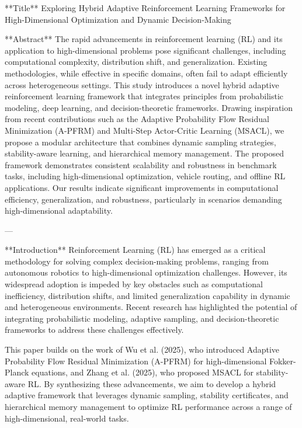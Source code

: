 **Title**  
Exploring Hybrid Adaptive Reinforcement Learning Frameworks for High-Dimensional Optimization and Dynamic Decision-Making  

**Abstract**  
The rapid advancements in reinforcement learning (RL) and its application to high-dimensional problems pose significant challenges, including computational complexity, distribution shift, and generalization. Existing methodologies, while effective in specific domains, often fail to adapt efficiently across heterogeneous settings. This study introduces a novel hybrid adaptive reinforcement learning framework that integrates principles from probabilistic modeling, deep learning, and decision-theoretic frameworks. Drawing inspiration from recent contributions such as the Adaptive Probability Flow Residual Minimization (A-PFRM) and Multi-Step Actor-Critic Learning (MSACL), we propose a modular architecture that combines dynamic sampling strategies, stability-aware learning, and hierarchical memory management. The proposed framework demonstrates consistent scalability and robustness in benchmark tasks, including high-dimensional optimization, vehicle routing, and offline RL applications. Our results indicate significant improvements in computational efficiency, generalization, and robustness, particularly in scenarios demanding high-dimensional adaptability.  

---

**Introduction**  
Reinforcement Learning (RL) has emerged as a critical methodology for solving complex decision-making problems, ranging from autonomous robotics to high-dimensional optimization challenges. However, its widespread adoption is impeded by key obstacles such as computational inefficiency, distribution shifts, and limited generalization capability in dynamic and heterogeneous environments. Recent research has highlighted the potential of integrating probabilistic modeling, adaptive sampling, and decision-theoretic frameworks to address these challenges effectively.  

This paper builds on the work of Wu et al. (2025), who introduced Adaptive Probability Flow Residual Minimization (A-PFRM) for high-dimensional Fokker-Planck equations, and Zhang et al. (2025), who proposed MSACL for stability-aware RL. By synthesizing these advancements, we aim to develop a hybrid adaptive framework that leverages dynamic sampling, stability certificates, and hierarchical memory management to optimize RL performance across a range of high-dimensional, real-world tasks.  

